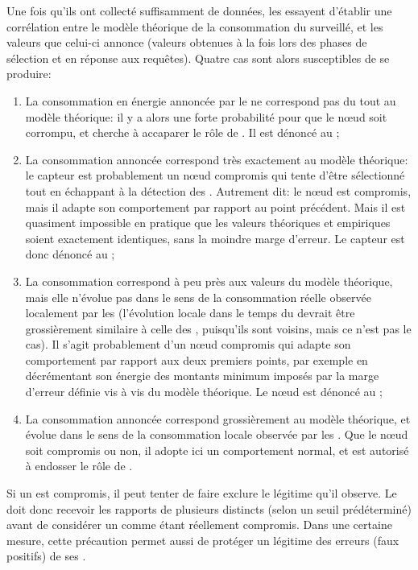 Une fois qu'ils ont collecté suffisamment de données, les \vns essayent d'établir une corrélation entre le modèle théorique de la consommation du \cn surveillé, et les valeurs que celui-ci annonce (valeurs obtenues à la fois lors des phases de sélection et en réponse aux requêtes).
Quatre cas sont alors susceptibles de se produire:
\begin{enumerate}
    \item La consommation en énergie annoncée par le \cn ne correspond pas du tout au modèle théorique: il y a alors une forte probabilité pour que le nœud soit corrompu, et cherche à accaparer le rôle de \cn. Il est dénoncé au \ch;
    \item La consommation annoncée correspond très exactement au modèle théorique: le capteur est probablement un nœud compromis qui tente d'être sélectionné tout en échappant à la détection des \vns. Autrement dit: le nœud est compromis, mais il adapte son comportement par rapport au point précédent. Mais il est quasiment impossible en pratique que les valeurs théoriques et empiriques soient exactement identiques, sans la moindre marge d'erreur. Le capteur est donc dénoncé au \ch;
    \item La consommation correspond à peu près aux valeurs du modèle théorique, mais elle n'évolue pas dans le sens de la consommation réelle observée localement par les \vns (l'évolution locale dans le temps du \cn devrait être grossièrement similaire à celle des \vns, puisqu'ils sont voisins, mais ce n'est pas le cas). Il s'agit probablement d'un nœud compromis qui adapte son comportement par rapport aux deux premiers points, par exemple en décrémentant son énergie des montants minimum imposés par la marge d'erreur définie vis à vis du modèle théorique. Le nœud est dénoncé au \ch;
    \item La consommation annoncée correspond grossièrement au modèle théorique, et évolue dans le sens de la consommation locale observée par les \vns. Que le nœud soit compromis ou non, il adopte ici un comportement normal, et est autorisé à endosser le rôle de \cn.
\end{enumerate}
Si un \vn est compromis, il peut tenter de faire exclure le \cn légitime qu'il observe.
Le \ch doit donc recevoir les rapports de plusieurs \vns distincts (selon un seuil prédéterminé) avant de considérer un \cn comme étant réellement compromis.
Dans une certaine mesure, cette précaution permet aussi de protéger un \cn légitime des erreurs (faux positifs) de ses \vns.

